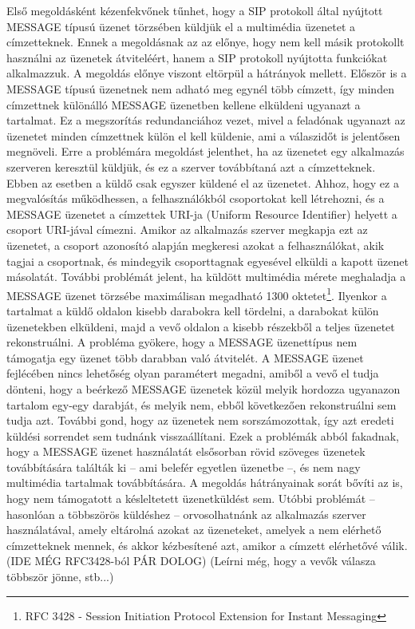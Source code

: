 Első megoldásként kézenfekvőnek tűnhet, hogy a SIP protokoll által nyújtott MESSAGE típusú üzenet törzsében küldjük el a multimédia üzenetet a címzetteknek. Ennek a megoldásnak az az előnye, hogy nem kell másik protokollt használni az üzenetek átviteléért, hanem a SIP protokoll nyújtotta funkciókat alkalmazzuk. A megoldás előnye viszont eltörpül a hátrányok mellett. Először is a MESSAGE típusú üzenetnek nem adható meg egynél több címzett, így minden címzettnek különálló MESSAGE üzenetben kellene elküldeni ugyanazt a tartalmat. Ez a megszorítás redundanciához vezet, mivel a feladónak ugyanazt az üzenetet minden címzettnek külön el kell küldenie, ami a válaszidőt is jelentősen megnöveli. Erre a problémára megoldást jelenthet, ha az üzenetet egy alkalmazás szerveren keresztül küldjük, és ez a szerver továbbítaná azt a címzetteknek. Ebben az esetben a küldő csak egyszer küldené el az üzenetet. Ahhoz, hogy ez a megvalósítás működhessen, a felhasználókból csoportokat kell létrehozni, és a MESSAGE üzenetet a címzettek URI-ja (Uniform Resource Identifier) helyett a csoport URI-jával címezni. Amikor az alkalmazás szerver megkapja ezt az üzenetet, a csoport azonosító alapján megkeresi azokat a felhasználókat, akik tagjai a csoportnak, és mindegyik csoporttagnak egyesével elküldi a kapott üzenet másolatát.
További problémát jelent, ha küldött multimédia mérete meghaladja a MESSAGE üzenet törzsébe maximálisan megadható 1300 oktetet\footnote{RFC 3428 - Session Initiation Protocol Extension for Instant Messaging}. Ilyenkor a tartalmat a küldő oldalon kisebb darabokra kell tördelni, a darabokat külön üzenetekben elküldeni, majd a vevő oldalon a kisebb részekből a teljes üzenetet rekonstruálni. A probléma gyökere, hogy a MESSAGE üzenettípus nem támogatja egy üzenet több darabban való átvitelét. A MESSAGE üzenet fejlécében nincs lehetőség olyan paramétert megadni, amiből a vevő el tudja dönteni, hogy a beérkező MESSAGE üzenetek közül melyik hordozza ugyanazon tartalom egy-egy darabját, és melyik nem, ebből következően rekonstruálni sem tudja azt. További gond, hogy az üzenetek nem sorszámozottak, így azt eredeti küldési sorrendet sem tudnánk visszaállítani. Ezek a problémák abból fakadnak, hogy a MESSAGE üzenet használatát elsősorban rövid szöveges üzenetek továbbítására találták ki -- ami belefér egyetlen üzenetbe --, és nem nagy multimédia tartalmak továbbítására. 
A megoldás hátrányainak sorát bővíti az is, hogy nem támogatott a késleltetett üzenetküldést sem. Utóbbi problémát -- hasonlóan a többszörös küldéshez -- orvosolhatnánk az alkalmazás szerver használatával, amely eltárolná azokat az üzeneteket, amelyek a nem elérhető címzetteknek mennek, és akkor kézbesítené azt, amikor a címzett elérhetővé válik.(IDE MÉG RFC3428-ból PÁR DOLOG)
(Leírni még, hogy a vevők válasza többször jönne, stb...)

